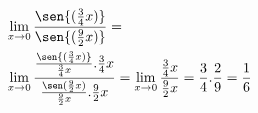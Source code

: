 \begin{ex}
\begin{align}
&\lim_{x\rightarrow 0} \frac{\sen{(\frac{3}{4}x)}}{\sen{(\frac{9}{2}x)}}=\nonumber\\
&\lim_{x\rightarrow 0} \frac{\frac{\sen{(\frac{3}{4}x)}}{\frac{3}{4}x}.\frac{3}{4}x}{\frac{\sen(\frac{9}{2}x)}{\frac{9}{2}x}.\frac{9}{2}x}=\lim_{x\rightarrow 0} \frac{\frac{3}{4}x}{\frac{9}{2}x}=\frac{3}{4}.\frac{2}{9}=\frac{1}{6}\nonumber
\end{align}
\end{ex}
